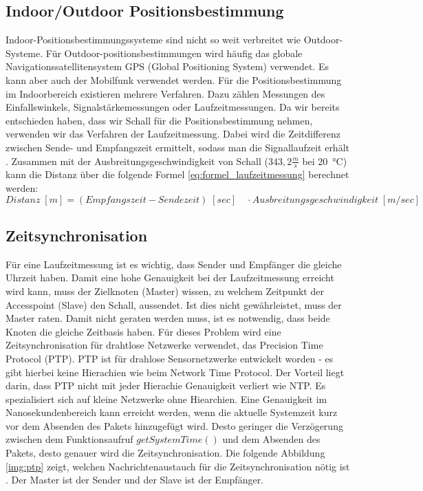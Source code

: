 \subsection{Indoor/Outdoor Positionsbestimmung}
Indoor-Positionsbestimmungssysteme sind nicht so weit verbreitet wie Outdoor-Systeme. Für Outdoor-positionsbestimmungen wird häufig das globale Navigationssatellitensystem GPS (Global Positioning System) verwendet. Es kann aber auch der Mobilfunk verwendet werden. Für die Positionsbestimmung im Indoorbereich existieren mehrere Verfahren. Dazu zählen Messungen des Einfallswinkels, Signalstärkemessungen oder Laufzeitmessungen. Da wir bereits entschieden haben, dass wir Schall für die Positionsbestimmung nehmen, verwenden wir das Verfahren der Laufzeitmessung. Dabei wird die Zeitdifferenz zwischen Sende- und Empfangszeit ermittelt, sodass man die Signallaufzeit erhält \cite{src_INDOOR_OUTDOOR_SYSTEME}. Zusammen mit der Ausbreitungsgeschwindigkeit von Schall ($343,2 \frac{m}{s}$ bei \SI{20}{\degreeCelsius}) kann die Distanz über die folgende Formel \ref{eq:formel_laufzeitmessung} berechnet werden:
\begin{equation}
   Distanz \;[m] = (Empfangszeit - Sendezeit)\;[sec]\quad \cdot Ausbreitungsgeschwindigkeit \;[m/sec]
   \label{eq:formel_laufzeitmessung}
\end{equation}

\subsection{Zeitsynchronisation}
Für eine Laufzeitmessung ist es wichtig, dass Sender und Empfänger die gleiche Uhrzeit haben. Damit eine hohe Genauigkeit bei der Laufzeitmessung erreicht wird kann, muss der Zielknoten (Master) wissen, zu welchem Zeitpunkt der Accesspoint (Slave) den Schall, aussendet. Ist dies nicht gewährleistet, muss der Master raten. Damit nicht geraten werden muss, ist es notwendig, dass beide Knoten die gleiche Zeitbasis haben. Für dieses Problem wird eine Zeitsynchronisation für drahtlose Netzwerke verwendet, das Precision Time Protocol (PTP). PTP ist für drahlose Sensornetzwerke entwickelt worden - es gibt hierbei keine Hierachien wie beim Network Time Protocol. Der Vorteil liegt darin, dass PTP nicht mit jeder Hierachie Genauigkeit verliert wie NTP. Es spezialisiert sich auf kleine Netzwerke ohne Hiearchien. Eine Genauigkeit im Nanosekundenbereich kann erreicht werden, wenn die aktuelle Systemzeit kurz vor dem Absenden des Pakets hinzugefügt wird. Desto geringer die Verzögerung zwischen dem Funktionsaufruf $getSystemTime()$ und dem Absenden des Pakets, desto genauer wird die Zeitsynchronisation. Die folgende Abbildung \ref{img:ptp} zeigt, welchen Nachrichtenaustauch für die Zeitsynchronisation nötig ist \cite{src_PTP}. Der Master ist der Sender und der Slave ist der Empfänger.

